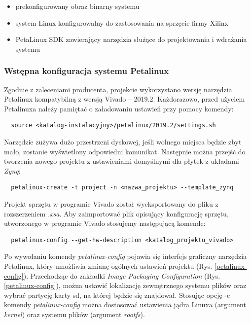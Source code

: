 \begin{itemize}
  \item prekonfigurowany obraz binarny systemu 
  \item system Linux konfigurowalny do zastosowania na sprzęcie firmy Xilinx 
  \item PetaLinux SDK zawierający narzędzia służące do projektowania i wdrażania systemu 
\end{itemize}

\subsubsection{Wstępna konfiguracja systemu Petalinux}

Zgodnie z zaleceniami producenta, projekcie wykorzystano wersję narzędzia Petalinux kompatybilną z wersją Vivado -- 
2019.2. Każdorazowo, przed użyciem Petalinuxa należy pamiętać o załadowaniu ustawień przy pomocy komendy:

\begin{verbatim}
  source <katalog-instalacyjny>/petalinux/2019.2/settings.sh
\end{verbatim} 

Narzędzie zużywa dużo przestrzeni dyskowej, jeśli wolnego miejsca będzie zbyt mało, zostanie wyświetlony odpowiedni 
komunikat. Następnie można przejść do tworzenia nowego projektu z ustawieniami domyślnymi dla płytek z układami \emph
{Zynq}:
\begin{verbatim}
  petalinux-create -t project -n <nazwa_projektu> --template_zynq
\end{verbatim}

Projekt sprzętu w programie Vivado został wyeksportowany do pliku z rozszerzeniem \emph{.xsa}. Aby zaimportować plik opisujący konfigurację sprzętu, utworzonego w programie Vivado stosujemy następującą komendę:

\begin{verbatim}  
  petalinux-config --get-hw-description <katalog_projektu_vivado>
\end{verbatim}

Po wywołaniu komendy \emph{petalinux-config} pojawia się interfejs graficzny narzędzia Petalinux, który umożliwia 
zmianę ogólnych ustawień projektu (Rys. \ref{petalinux-config}). Przechodząc do zakładki \emph{Image Packaging 
Configuration} (Rys. \ref{petalinux-config}), można ustawić lokalizację zewnętrznego systemu plików oraz wybrać 
partycję karty sd, na której będzie się znajdował. Stosując opcję -c komendy \emph{petalinux-config} można dostosować 
ustawienia jądra Linuxa (argument \emph{kernel}) oraz systemu plików (argument \emph{rootfs}).

